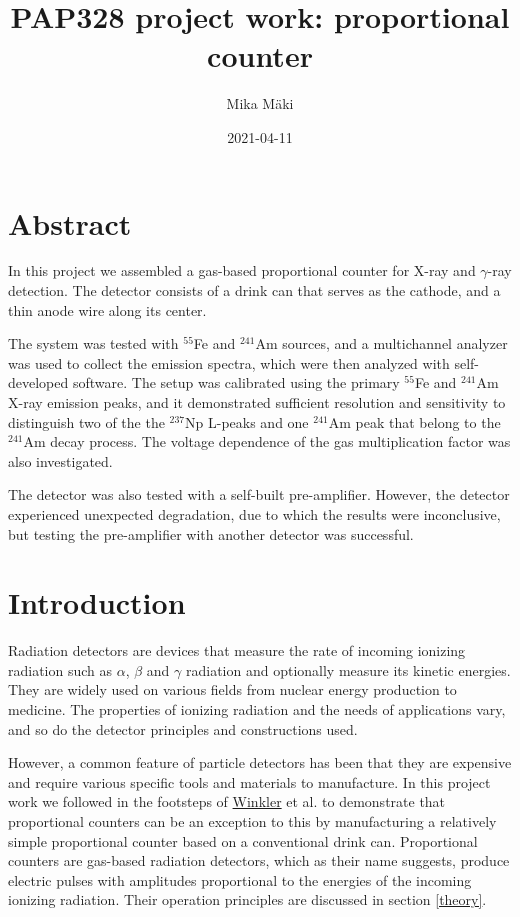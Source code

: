 \documentclass[a4paper]{article}
\title{PAP328 project work: proportional counter}
\author{Mika Mäki}
\date{2021-04-11}
\begin{document}
\maketitle

\section*{Abstract}
In this project we assembled a gas-based proportional counter for X-ray and $\gamma$-ray detection.
The detector consists of a drink can that serves as the cathode, and a thin anode wire along its center.


The system was tested with $^{55}$Fe and $^{241}$Am sources, and a multichannel analyzer was used to collect the emission spectra, which were then analyzed with self-developed software.
The setup was calibrated using the primary $^{55}$Fe and $^{241}$Am X-ray emission peaks, and it demonstrated sufficient resolution  and sensitivity to distinguish two of the the $^{237}$Np L-peaks and one $^{241}$Am peak that belong to the $^{241}$Am decay process.
The voltage dependence of the gas multiplication factor was also investigated.

The detector was also tested with a self-built pre-amplifier.
However, the detector experienced unexpected degradation, due to which the results were inconclusive, but testing the pre-amplifier with another detector was successful.

\tableofcontents


\section{Introduction}
\label{introduction}
Radiation detectors are devices that measure the rate of incoming ionizing radiation such as $\alpha$, $\beta$ and $\gamma$ radiation and optionally measure its kinetic energies.
They are widely used on various fields from nuclear energy production to medicine.
The properties of ionizing radiation and the needs of applications vary, and so do the detector principles and constructions used.

However, a common feature of particle detectors has been that they are expensive and require various specific tools and materials to manufacture.
In this project work we followed in the footsteps of
\href{https://www.helsinki.fi/en/people/people-finder/alexander-winkler-9110087}{Winkler}
et al. \cite{winkler_gaseous_2015} to demonstrate that proportional counters can be an exception to this by manufacturing a relatively simple proportional counter based on a conventional drink can.
Proportional counters are gas-based radiation detectors, which as their name suggests, produce electric pulses with amplitudes proportional to the energies of the incoming ionizing radiation.
Their operation principles are discussed in section \ref{theory}.
\end{document}
